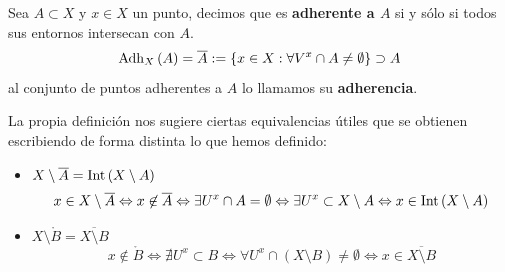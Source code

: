 \begin{defi}[Adherencia]
Sea $A \subset X$ y $x\in X$ un punto, decimos que es \textbf{adherente a $A$} si y sólo si todos sus entornos intersecan con $A$.
$$
\operatorname{Adh}_X\left( A \right) = \overline{A} := \{x \in X: \forall V^x \cap A \neq \emptyset\} \supset A
$$
al conjunto de puntos adherentes a $A$ lo llamamos su \textbf{adherencia}.
\end{defi}

\begin{obs}
La propia definición nos sugiere ciertas equivalencias útiles que se obtienen escribiendo de forma distinta lo que hemos definido:
\begin{itemize}
\item $X \setminus \overline{A} = \operatorname{Int}\left( X \setminus A \right)$
$$
x \in X \setminus \overline{A} \Leftrightarrow x \not\in \overline{A} \Leftrightarrow \exists U^x \cap A = \emptyset \Leftrightarrow \exists U^x \subset X \setminus A \Leftrightarrow x \in \operatorname{Int}\left( X \setminus A \right)
$$
\item $X \setminus \mathring{B} = \overline{X \setminus B}$
$$
x \not\in \mathring{B} \Leftrightarrow \nexists U^x \subset B \Leftrightarrow \forall U^x \cap \left( X \setminus B \right) \neq \emptyset \Leftrightarrow x \in \overline{X \setminus B}
$$
\end{itemize}
\end{obs}

